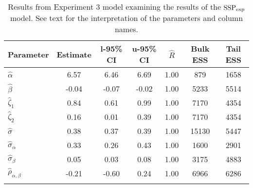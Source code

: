 \begin{table}

\caption{Results from Experiment 3 model examining the results of the $\operatorname{SSP}_{\text{exp}}$ model. \label{tab:Experiment 3-SSP}See text for the interpretation of the parameters and column names.}

\begin{tabular}{l *3{S[table-format=-1.2]} S[table-format=1.2] *2{S[table-format=5.0]}}
\lsptoprule
Parameter & {Estimate} & {l-95\% CI} & {u-95\% CI} & {$\hat{R}$} & {Bulk ESS} & {Tail ESS}\\
\midrule
$\hat\alpha$ & 6.57 & 6.46 & 6.69 & 1.00 & 879 & 1658\\
$\hat\beta$ & -0.04 & -0.07 & -0.02 & 1.00 & 5233 & 5514\\
$\hat\zeta_{1}$ & 0.84 & 0.61 & 0.99 & 1.00 & 7170 & 4354\\
$\hat\zeta_{2}$ & 0.16 & 0.01 & 0.39 & 1.00 & 7170 & 4354\\
$\hat\sigma$ & 0.38 & 0.37 & 0.39 & 1.00 & 15130 & 5447\\
$\hat\sigma_{\alpha}$ & 0.33 & 0.26 & 0.43 & 1.00 & 1600 & 2901\\
$\hat\sigma_{\beta}$ & 0.05 & 0.03 & 0.08 & 1.00 & 3175 & 4883\\
$\hat\rho_{\alpha,\beta}$ & -0.21 & -0.60 & 0.24 & 1.00 & 6966 & 6286\\
\lspbottomrule
\end{tabular}

\end{table}






